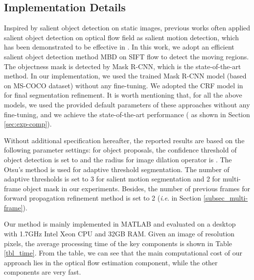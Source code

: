 \documentclass[journal]{IEEEtran}
\newcommand{\ie}{\textit{i}.\textit{e}. }
\begin{document}
\subsection{Implementation Details}
\label{sec:exp-details}
Inspired by salient object detection on static images, previous works often applied salient object detection on optical flow field as salient motion detection, which has been demonstrated to be effective in \cite{CVPR2016_Perazzi,CVPR2017_Jain}. In this work, we adopt an efficient salient object detection method MBD \cite{ICCV2015_Zhang} on SIFT flow \cite{TPAMI2011_Liu} to detect the moving regions.
The objectness mask is detected by Mask R-CNN, which is the state-of-the-art method. In our implementation, we used the trained Mask R-CNN model (based on MS-COCO dataset) without any fine-tuning. We adopted the CRF model in \cite{NIPS2011_Krahenbuhl} for final segmentation refinement.
It is worth mentioning that, for all the above models, we used the provided default parameters of these approaches without any fine-tuning, and we achieve the state-of-the-art performance ( as shown in Section \ref{sec:exp-comp}). 

Without additional specification hereafter, the reported results are based on the following parameter settings: for object proposals, the confidence threshold of object detection is set to  and the radius for image dilation operator is .
The Otsu's method \cite{TSMC1979_Otsu} is used for adaptive threshold segmentation. The number of adaptive thresholds is set to 3 for salient motion segmentation and 2 for multi-frame object mask in our experiments.
Besides, the number of previous frames for forward propagation refinement method is set to 2 (\ie  in Section \ref{subsec_multi-frame}).

Our method is mainly implemented in MATLAB and evaluated on a desktop with 1.7GHz Intel Xeon CPU and 32GB RAM.
Given an image of resolution  pixels,
the average processing time of the key components is shown in Table \ref{tbl_time}. 
From the table, we can see that the main computational cost of our approach lies in the optical flow estimation component, while the other components are very fast.
\end{document}
